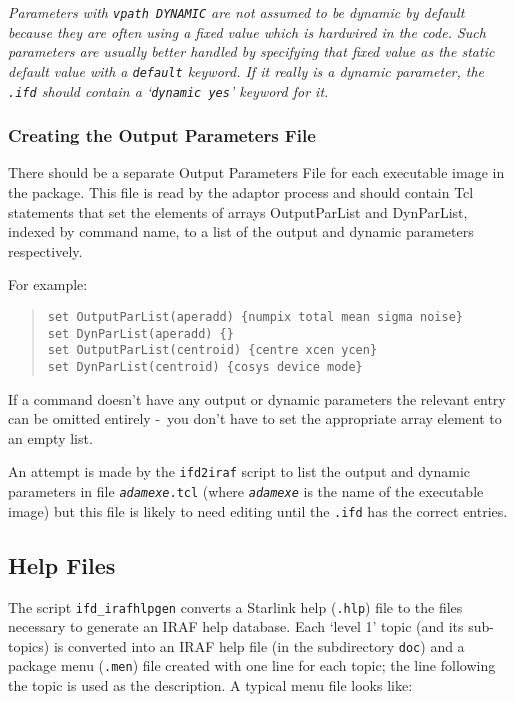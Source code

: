 \documentclass[twoside,11pt]{article}
\newcommand{\xref}[3]{#1}
\newcommand{\xlabel}[1]{}
\newcommand{\itfile}[2]{\texttt{\textit{#1}#2}}
\newcommand{\dash}{--}
\renewcommand{\dash}{-}
\begin{document}
\emph{Parameters with \texttt{vpath DYNAMIC} are not assumed to be dynamic by
default because they are often using a fixed value which is hardwired in the
code. Such parameters are usually better handled by specifying that fixed
value as the static default value with a
\xref{\texttt{default}}{ssn68}{default}
keyword.
If it really is a dynamic parameter, the \texttt{.ifd} should contain a
\xref{`\texttt{dynamic yes}'}{ssn68}{dynamic}
keyword for it.}

\subsubsection{\xlabel{creating_the_output_parameters_file}Creating the Output Parameters File}
There should be a separate Output Parameters File for each executable image in
the package.
This file is read by the adaptor process and should contain Tcl statements that
set the elements of arrays OutputParList and DynParList, indexed by command
name, to a list of the output and dynamic parameters respectively.

For example:
\begin{quote} \begin{verbatim}
set OutputParList(aperadd) {numpix total mean sigma noise}
set DynParList(aperadd) {}
set OutputParList(centroid) {centre xcen ycen}
set DynParList(centroid) {cosys device mode}
\end{verbatim} \end{quote}

If a command doesn't have any output or dynamic parameters the relevant entry
can be omitted entirely \dash\ you don't have to set the appropriate array
element to an empty list.

An attempt is made by the
\xref{\texttt{ifd2iraf}}{ssn68}{producing_iraf_files_from_an_ifd}
script to list the output and dynamic parameters in file \itfile{adamexe}{.tcl}
(where \texttt{\textit{adamexe}} is the name of the executable image) but
this file is likely to need editing until the \texttt{.ifd} has the correct
entries.

\subsection{\xlabel{help_files}Help Files}
The script \texttt{ifd\_irafhlpgen} converts a Starlink help (\texttt{.hlp})
file to the files necessary to generate an IRAF help database. Each `level 1'
topic (and its sub-topics) is converted into an IRAF help file (in the
subdirectory \texttt{doc}) and a package menu (\texttt{.men}) file created
with one line for each topic; the line following the topic is used
as the description. A typical menu file looks like:
\end{document}
